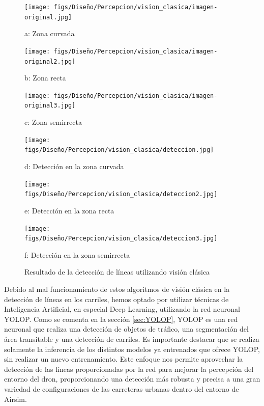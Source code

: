 \begin{figure}[H]
  \centering
  \begin{minipage}[t]{0.3\textwidth}
      \centering
      \texttt{[image: figs/Diseño/Percepcion/vision\_clasica/imagen-original.jpg]}
      \caption*{a: Zona curvada}
  \end{minipage}
  \hfill
  \begin{minipage}[t]{0.3\textwidth}
      \centering
      \texttt{[image: figs/Diseño/Percepcion/vision\_clasica/imagen-original2.jpg]}
      \caption*{b: Zona recta}
  \end{minipage}
  \hfill
  \begin{minipage}[t]{0.3\textwidth}
      \centering
      \texttt{[image: figs/Diseño/Percepcion/vision\_clasica/imagen-original3.jpg]}
      \caption*{c: Zona semirrecta}
  \end{minipage}
  
  \vspace{1cm}
  
  \begin{minipage}[t]{0.3\textwidth}
      \centering
      \texttt{[image: figs/Diseño/Percepcion/vision\_clasica/deteccion.jpg]}
      \caption*{d: Detección en la zona curvada}
  \end{minipage}
  \hfill
  \begin{minipage}[t]{0.3\textwidth}
      \centering
      \texttt{[image: figs/Diseño/Percepcion/vision\_clasica/deteccion2.jpg]}
      \caption*{e: Detección en la zona recta}
  \end{minipage}
  \hfill
  \begin{minipage}[t]{0.3\textwidth}
      \centering
      \texttt{[image: figs/Diseño/Percepcion/vision\_clasica/deteccion3.jpg]}
      \caption*{f: Detección en la zona semirrecta}
  \end{minipage}
  \caption{Resultado de la detección de líneas utilizando visión clásica}
  \label{Vision_clasica}
\end{figure}

Debido al mal funcionamiento de estos algoritmos de visión clásica en la detección de líneas en los carriles, 
hemos optado por utilizar técnicas de Inteligencia Artificial, en especial Deep Learning, utilizando la red neuronal YOLOP. Como se comenta en la sección \ref{sec:YOLOP}, 
YOLOP es una red neuronal que realiza una detección de objetos de tráfico, una segmentación del área transitable y una detección de carriles. Es importante 
destacar que se realiza solamente la inferencia de los distintos modelos ya entrenados que ofrece YOLOP, sin realizar un nuevo entrenamiento. Este enfoque nos permite aprovechar 
la detección de las líneas proporcionadas por la red para mejorar la percepción del entorno del dron, proporcionando una detección más robusta y precisa a una gran variedad de configuraciones
de las carreteras urbanas dentro del entorno de Airsim. 

